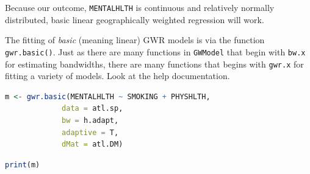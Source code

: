 \documentclass[
]{book}
\newcommand{\passthrough}[1]{#1}
\begin{document}
Because our outcome, \passthrough{\lstinline!MENTALHLTH!} is continuous and relatively normally distributed, basic linear geographically weighted regression will work.

The fitting of \emph{basic} (meaning linear) GWR models is via the function \passthrough{\lstinline!gwr.basic()!}. Just as there are many functions in \passthrough{\lstinline!GWModel!} that begin with \passthrough{\lstinline!bw.x!} for estimating bandwidths, there are many functions that begins with \passthrough{\lstinline!gwr.x!} for fitting a variety of models. Look at the help documentation.

\begin{lstlisting}[language=R]
m <- gwr.basic(MENTALHLTH ~ SMOKING + PHYSHLTH, 
             data = atl.sp, 
             bw = h.adapt,
             adaptive = T,
             dMat = atl.DM)
\end{lstlisting}

\begin{lstlisting}[language=R]
print(m)
\end{lstlisting}
\end{document}
